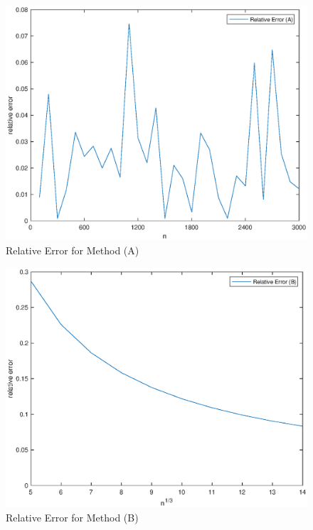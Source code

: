 \documentclass[11pt]{article}
\newcommand{\1}{\mathbbm{1}}
\begin{document}
\begin{figure}[h]
	\centering
		\includegraphics[width=5in]{fig2.eps}
	\caption{Relative Error for Method (A)}
	\label{fig:1}
\end{figure}
\begin{figure}[h]
	\centering
		\includegraphics[width=5in]{fig1.eps}
	\caption{Relative Error for Method (B)}
	\label{fig:2}
\end{figure}
\end{document}
